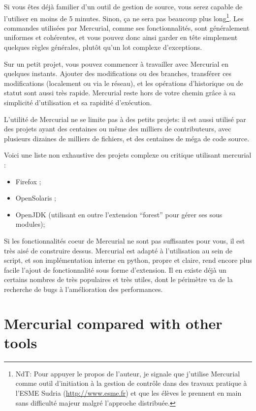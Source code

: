 Si vous êtes déjà familier d'un outil de gestion de source, vous serez
capable de l'utiliser en moins de 5 minutes. Sinon, ça ne sera pas beaucoup
plus long\footnote{NdT: Pour appuyer le propos de l'auteur, je signale que 
j'utilise Mercurial comme outil d'initiation à la gestion de contrôle dans
des travaux pratique à l'ESME Sudria (\url{http://www.esme.fr}) et que les
élèves le prennent en main sans difficulté majeur malgré l'approche distribuée.}. 
Les commandes utilisées par Mercurial, comme ses fonctionnalités, sont 
généralement uniformes et cohérentes, et vous pouvez donc ainsi garder en tête 
simplement quelques règles générales, plutôt qu'un lot complexe d'exceptions.

Sur un petit projet, vous pouvez commencer à travailler avec Mercurial en
quelques instants. Ajouter des modifications ou des branches, transférer 
ces modifications (localement ou via le réseau), et les opérations 
d'historique ou de statut sont aussi très rapide. Mercurial reste hors de 
votre chemin grâce à sa simplicité d'utilisation et sa rapidité d'exécution.

L'utilité de Mercurial ne se limite pas à des petits projets: il est 
aussi utilisé par des projets ayant des centaines ou même des milliers
de contributeurs, avec plusieurs dizaines de milliers de fichiers, et des
centaines de méga de code source.

Voici une liste non exhaustive des projets complexe ou critique utilisant 
mercurial :
\begin{itemize}
	\item Firefox ;
	\item OpenSolaris ;
	\item OpenJDK (utilisant en outre l'extension ``forest'' pour gérer
	ses sous modules);
\end{itemize}

Si les fonctionnalités coeur de Mercurial ne sont pas suffisantes pour vous, 
il est très aisé de construire dessus. Mercurial est adapté à l'utilisation
au sein de script, et son implémentation interne en python, propre et claire,
rend encore plus facile l'ajout de fonctionnalité sous forme d'extension. Il
en existe déjà un certains nombres de très populaires et très utiles, 
dont le périmètre va de la recherche de bugs à l'amélioration des performances.

\section{Mercurial compared with other tools}

